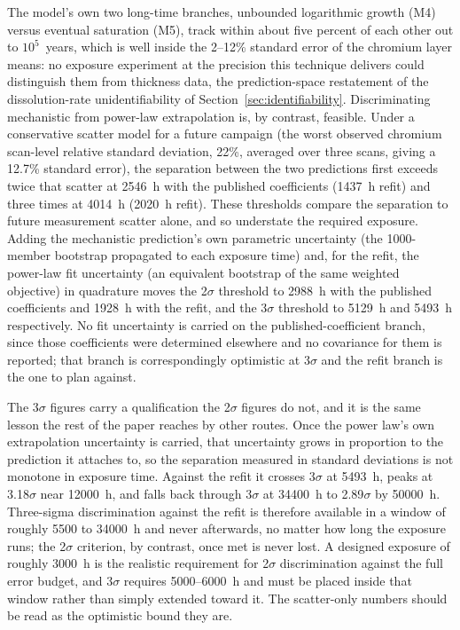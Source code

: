 \documentclass[pdflatex,sn-nature]{sn-jnl}
\begin{document}
The model's own two long-time branches, unbounded logarithmic growth
(M4) versus eventual saturation (M5), track within about five percent
of each other out to $10^5$~years, which is well inside the 2--12\% standard error of the chromium layer means: no exposure
experiment at the precision this technique delivers could distinguish
them from thickness data, the prediction-space
restatement of the dissolution-rate unidentifiability of
Section~\ref{sec:identifiability}. Discriminating mechanistic from
power-law extrapolation is, by contrast, feasible. Under a conservative
scatter model for a future campaign (the worst observed chromium
scan-level relative standard deviation, 22\%, averaged over three
scans, giving a 12.7\% standard error), the separation between the two
predictions first exceeds twice that scatter at 2546~h with the
published coefficients (1437~h refit) and three times at 4014~h
(2020~h refit). These thresholds compare the separation to future
measurement scatter alone, and so understate the required exposure. Adding
the mechanistic prediction's own parametric uncertainty (the
1000-member bootstrap propagated to each exposure time) and, for the
refit, the power-law fit uncertainty (an equivalent bootstrap of the same
weighted objective) in quadrature moves the 2$\sigma$ threshold to 2988~h
with the published coefficients and 1928~h with the refit, and the
3$\sigma$ threshold to 5129~h and 5493~h respectively. No fit uncertainty
is carried on the published-coefficient branch, since those coefficients
were determined elsewhere and no covariance for them is reported; that
branch is correspondingly optimistic at 3$\sigma$ and the refit branch is
the one to plan against.

The 3$\sigma$ figures carry a qualification the 2$\sigma$ figures do not,
and it is the same lesson the rest of the paper reaches by other routes.
Once the power law's own extrapolation uncertainty is carried, that
uncertainty grows in proportion to the prediction it attaches to, so the
separation measured in standard deviations is not monotone in exposure
time. Against the refit it crosses 3$\sigma$ at 5493~h, peaks at
3.18$\sigma$ near 12000~h, and falls back through 3$\sigma$ at
34400~h to 2.89$\sigma$ by 50000~h. Three-sigma discrimination against
the refit is therefore available in a window of roughly 5500 to
34000~h and never afterwards, no matter how long the exposure runs; the
2$\sigma$ criterion, by contrast, once met is never lost. A designed
exposure of roughly 3000~h is the realistic requirement for 2$\sigma$
discrimination against the full error budget, and 3$\sigma$ requires
5000--6000~h and must be placed inside that window rather than simply
extended toward it. The scatter-only numbers should be read as the
optimistic bound they are.
\end{document}
